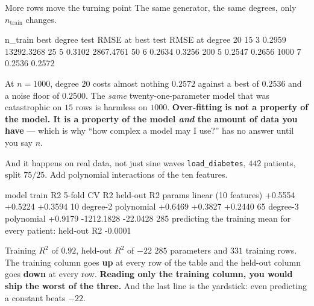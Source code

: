 \documentclass[aspectratio=169]{beamer}
\begin{document}
\begin{frame}[fragile,shrink=8]{More rows move the turning point}
The same generator, the same degrees, only $n_{\text{train}}$ changes.
\begin{outblk}
 n_train   best degree   test RMSE at best   test RMSE at degree 20
     15         3              0.2959               13292.3268
     25         5              0.3102                2867.4761
     50         6              0.2634                   0.3256
    200         5              0.2547                   0.2656
   1000         7              0.2536                   0.2572
\end{outblk}
\begin{alertblock}{At $n = 1000$, degree $20$ costs almost nothing}
  \footnotesize $0.2572$ against a best of $0.2536$ and a noise floor of
  $0.2500$. The \emph{same} twenty-one-parameter model that was catastrophic
  on $15$ rows is harmless on $1000$. \textbf{Over-fitting is not a property
  of the model. It is a property of the model \emph{and} the amount of data
  you have} --- which is why ``how complex a model may I use?'' has no answer
  until you say $n$.
\end{alertblock}
\end{frame}

\begin{frame}[fragile,shrink=8]{And it happens on real data, not just sine waves}
\texttt{load\_diabetes}, $442$ patients, split $75/25$. Add polynomial
interactions of the ten features.
\begin{outblk}
model                          train R2    5-fold CV R2   held-out R2   params
linear (10 features)         +0.5554        +0.5224        +0.3594          10
degree-2 polynomial          +0.6469        +0.3827        +0.2440          65
degree-3 polynomial          +0.9179     -1212.1828       -22.0428         285
predicting the training mean for every patient: held-out R2 -0.0001
\end{outblk}
\begin{alertblock}{Training $R^2$ of $0.92$, held-out $R^2$ of $-22$}
  \footnotesize $285$ parameters and $331$ training rows. The training column
  goes \textbf{up} at every row of the table and the held-out column goes
  \textbf{down} at every row. \textbf{Reading only the training column, you
  would ship the worst of the three.} And the last line is the yardstick: even
  predicting a constant beats $-22$.
\end{alertblock}
\end{frame}
\end{document}
